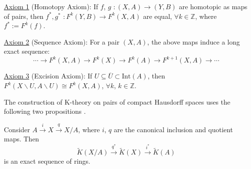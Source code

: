 \documentclass[11pt,a4paper]{article}
\begin{document}
\underline{Axiom 1} (Homotopy Axiom): If $f$, $g$ $:(X, A) \rightarrow (Y,B)$ are homotopic as maps of pairs, then $f^*, g^*$ $:F^k(Y, B) \rightarrow F^k(X, A)$ are equal, $\forall k\in \mathbb{Z}$, where $f^*:= F^k(f)$.

\underline{Axiom 2} (Sequence Axiom): For a pair $(X, A)$, the above maps induce a long exact sequence:
$$\cdots \rightarrow F^k(X, A)\rightarrow F^k(X) \rightarrow F^k(A) \rightarrow F^{k+1}(X, A)\rightarrow \cdots$$


\underline{Axiom 3} (Excision Axiom): If $U\subseteq \overline{U} \subset \text{Int}(A)$, then $F^k(X\backslash U, A\backslash U) \cong F^k(X, A)$, $\forall k$, $k\in \mathbb{Z}$.

The construction of K-theory on pairs of compact Hausdorff spaces uses the following two propositions \cite{hatcher2003vector}.

\begin{proposition}
Consider $A\xrightarrow{i} X \xrightarrow{q} X/A$, where $i$, $q$ are the canonical inclusion and quotient maps. Then
$$\widetilde{K}(X/A) \xrightarrow{q^*} \widetilde{K}(X) \xrightarrow{i^*} \widetilde{K}(A)$$
is an exact sequence of rings.
\end{proposition}
\end{document}
